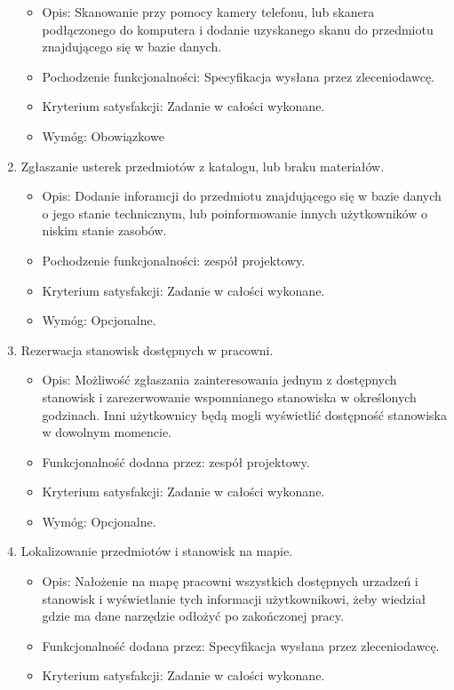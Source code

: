 \documentclass{article}
\begin{document}
\begin{enumerate}
\begin{itemize}
\item Opis: Skanowanie przy pomocy kamery telefonu, lub skanera podłączonego do komputera i dodanie uzyskanego skanu do przedmiotu znajdującego się w bazie danych.
\item Pochodzenie funkcjonalności: Specyfikacja wysłana przez zleceniodawcę. 
\item Kryterium satysfakcji: Zadanie w całości wykonane.
\item Wymóg: Obowiązkowe
\end{itemize}
\item  Zgłaszanie usterek przedmiotów z katalogu, lub braku materiałów.
\begin{itemize}
\item Opis: Dodanie inforamcji do przedmiotu znajdującego się w bazie danych o jego stanie technicznym, lub poinformowanie innych użytkowników o niskim stanie zasobów.
\item Pochodzenie funkcjonalności: zespół projektowy.
\item Kryterium satysfakcji: Zadanie w całości wykonane.
\item Wymóg: Opcjonalne.
\end{itemize}
\item  Rezerwacja stanowisk dostępnych w pracowni.
\begin{itemize}
\item Opis: Możliwość zgłaszania zainteresowania jednym z dostępnych stanowisk i zarezerwowanie wspomnianego stanowiska w określonych godzinach. Inni użytkownicy będą mogli wyświetlić dostępność stanowiska w dowolnym momencie.
\item Funkcjonalność dodana przez: zespół projektowy.
\item Kryterium satysfakcji: Zadanie w całości wykonane.
\item Wymóg: Opcjonalne.
\end{itemize}
\item Lokalizowanie przedmiotów i stanowisk na mapie.
\begin{itemize}
\item Opis: Nałożenie na mapę pracowni wszystkich dostępnych urzadzeń i stanowisk i wyświetlanie tych informacji użytkownikowi, żeby wiedział gdzie ma dane narzędzie odłożyć po zakończonej pracy.
\item Funkcjonalność dodana przez: Specyfikacja wysłana przez zleceniodawcę.
\item Kryterium satysfakcji: Zadanie w całości wykonane.

\end{itemize}
\end{enumerate}
\end{document}
